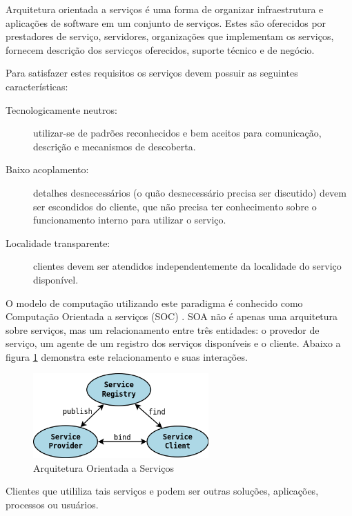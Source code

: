 Arquitetura orientada a servi\c{c}os \'e uma forma de organizar infraestrutura e aplica\c{c}\~oes de software em um conjunto de servi\c{c}os. Estes s\~ao oferecidos por prestadores de servi\c{c}o, servidores, organiza\c{c}\~oes que implementam os servi\c{c}os, fornecem descri\c{c}\~ao dos servic\c{c}os oferecidos, suporte t\'ecnico e de neg\'ocio.

Para satisfazer estes requisitos os servi\c{c}os devem possuir as seguintes caracter\'isticas:
\begin{description}
    \item[Tecnologicamente neutros:] utilizar-se de padr\~oes reconhecidos e bem aceitos para comunica\c{c}\~ao, descri\c{c}\~ao e mecanismos de descoberta.
    \item[Baixo acoplamento:] detalhes desnecess\'arios (o qu\~ao desnecess\'ario precisa ser discutido) devem ser escondidos do cliente, que n\~ao precisa ter conhecimento sobre o funcionamento interno para utilizar o servi\c{c}o.
    \item[Localidade transparente:] clientes devem ser atendidos independentemente da localidade do servi\c{c}o dispon\'ivel.
\end{description}

O modelo de computa\c{c}\~ao utilizando este paradigma \'e conhecido como Computa\c{c}\~ao Orientada a servi\c{c}os (SOC) \cite{581580}. SOA n\~ao \'e apenas uma arquitetura sobre servi\c{c}os, mas um relacionamento entre tr\^es entidades: o provedor de servi\c{c}o, um agente de um registro dos servi\c{c}os dispon\'iveis e o cliente. Abaixo a figura \ref{soaOverview} demonstra este relacionamento e suas intera\c{c}\~oes.

\begin{figure}[H]
   \label{soaOverview}
   \centering
   \includegraphics[width=0.6\textwidth]{figuras/soa.png}
   \caption{Arquitetura Orientada a Servi\c{c}os}
\end{figure}

Clientes que utililiza tais servi\c{c}os e podem ser outras solu\c{c}\~oes, aplica\c{c}\~oes, processos ou usu\'arios.

